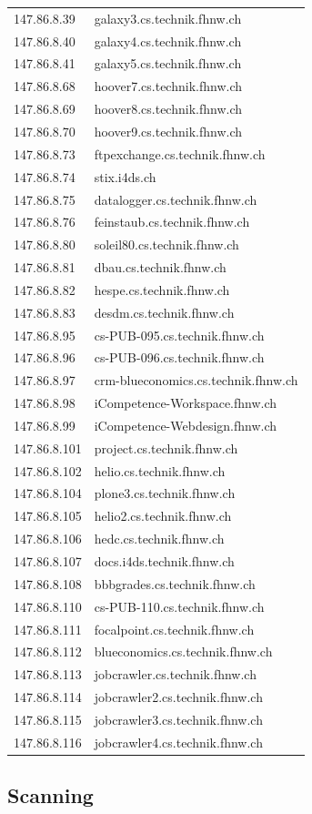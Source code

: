 \documentclass[11pt,a4paper]{scrartcl}
\begin{document}
\begin{longtable}{p{2.5cm}|p{7cm}}
	147.86.8.39 & galaxy3.cs.technik.fhnw.ch \\
	147.86.8.40 & galaxy4.cs.technik.fhnw.ch \\
	147.86.8.41 & galaxy5.cs.technik.fhnw.ch \\
	147.86.8.68 & hoover7.cs.technik.fhnw.ch \\
	147.86.8.69 & hoover8.cs.technik.fhnw.ch \\
	147.86.8.70 & hoover9.cs.technik.fhnw.ch \\
	147.86.8.73 & ftpexchange.cs.technik.fhnw.ch \\
	147.86.8.74 & stix.i4ds.ch \\
	147.86.8.75 & datalogger.cs.technik.fhnw.ch \\
	147.86.8.76 & feinstaub.cs.technik.fhnw.ch \\
	147.86.8.80 & soleil80.cs.technik.fhnw.ch \\
	147.86.8.81 & dbau.cs.technik.fhnw.ch \\
	147.86.8.82 & hespe.cs.technik.fhnw.ch \\
	147.86.8.83 & desdm.cs.technik.fhnw.ch \\
	147.86.8.95 & cs-PUB-095.cs.technik.fhnw.ch \\
	147.86.8.96 & cs-PUB-096.cs.technik.fhnw.ch \\
	147.86.8.97 & crm-blueconomics.cs.technik.fhnw.ch \\
	147.86.8.98 & iCompetence-Workspace.fhnw.ch \\
	147.86.8.99 & iCompetence-Webdesign.fhnw.ch \\
	147.86.8.101 & project.cs.technik.fhnw.ch \\
	147.86.8.102 & helio.cs.technik.fhnw.ch \\
	147.86.8.104 & plone3.cs.technik.fhnw.ch \\
	147.86.8.105 & helio2.cs.technik.fhnw.ch \\
	147.86.8.106 & hedc.cs.technik.fhnw.ch \\
	147.86.8.107 & docs.i4ds.technik.fhnw.ch \\
	147.86.8.108 & bbbgrades.cs.technik.fhnw.ch \\
	147.86.8.110 & cs-PUB-110.cs.technik.fhnw.ch \\
	147.86.8.111 & focalpoint.cs.technik.fhnw.ch \\
	147.86.8.112 & blueconomics.cs.technik.fhnw.ch \\
	147.86.8.113 & jobcrawler.cs.technik.fhnw.ch \\
	147.86.8.114 & jobcrawler2.cs.technik.fhnw.ch \\
	147.86.8.115 & jobcrawler3.cs.technik.fhnw.ch \\
	147.86.8.116 & jobcrawler4.cs.technik.fhnw.ch \\
\end{longtable}

\subsection{Scanning}
\end{document}
